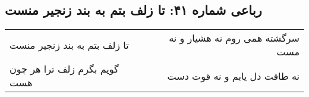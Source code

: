 \begin{center}
\section*{رباعی شماره ۴۱: تا زلف بتم به بند زنجیر منست}
\label{sec:sh041}
\begin{longtable}{l p{0.5cm} r}
تا زلف بتم به بند زنجیر منست
&&
سرگشته همی روم نه هشیار و نه مست
\\
گویم بگرم زلف ترا هر چون هست
&&
نه طاقت دل یابم و نه قوت دست
\\
\end{longtable}
\end{center}
